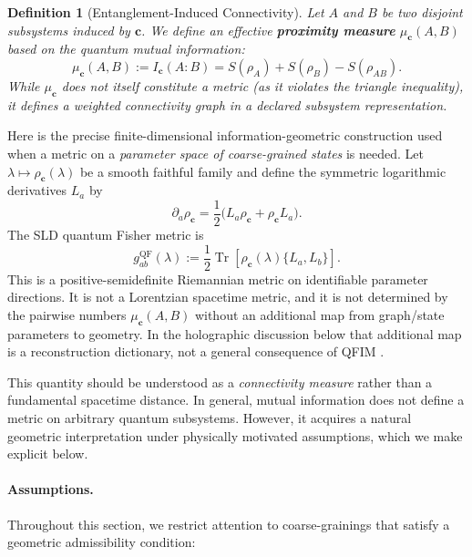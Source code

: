 \documentclass[12pt,a4paper,openany]{book}
\newtheorem{definition}[theorem]{Definition}
\begin{document}
\begin{definition}[Entanglement-Induced Connectivity]
\label{H-A-def:connectivity}
Let $A$ and $B$ be two disjoint subsystems induced by $\mathbf{c}$.
We define an effective \textbf{proximity measure} $\mu_{\mathbf{c}}(A,B)$ based on the quantum mutual information:
\begin{equation}
\mu_{\mathbf{c}}(A,B) := I_{\mathbf{c}}(A:B) = S(\rho_A) + S(\rho_B) - S(\rho_{AB}).
\end{equation}
While $\mu_{\mathbf{c}}$ does not itself constitute a metric (as it violates the triangle inequality), it defines a weighted connectivity graph in a declared subsystem representation.
\end{definition}

Here is the precise finite-dimensional information-geometric construction used when a metric on a \emph{parameter space of coarse-grained states} is needed.  Let $\lambda\mapsto\rho_{\mathbf c}(\lambda)$ be a smooth faithful family and define the symmetric logarithmic derivatives $L_a$ by
\[
\partial_a\rho_{\mathbf c}
=\frac12\bigl(L_a\rho_{\mathbf c}+\rho_{\mathbf c}L_a\bigr).
\]
The SLD quantum Fisher metric is
\begin{equation}
g^{\mathrm{QF}}_{ab}(\lambda)
:=\frac12\operatorname{Tr}\!\left[
\rho_{\mathbf c}(\lambda)\{L_a,L_b\}\right].
\label{H-A-eq:qfim}
\end{equation}
This is a positive-semidefinite Riemannian metric on identifiable parameter directions.  It is not a Lorentzian spacetime metric, and it is not determined by the pairwise numbers $\mu_{\mathbf c}(A,B)$ without an additional map from graph/state parameters to geometry.  In the holographic discussion below that additional map is a reconstruction dictionary, not a general consequence of QFIM \cite{Petz1996}.

This quantity should be understood as a \emph{connectivity measure} rather than a fundamental spacetime distance.
In general, mutual information does not define a metric on arbitrary quantum subsystems.
However, it acquires a natural geometric interpretation under physically motivated assumptions, which we make explicit below.

\paragraph{Assumptions.}
Throughout this section, we restrict attention to coarse-grainings that satisfy a geometric admissibility condition:
\end{document}
